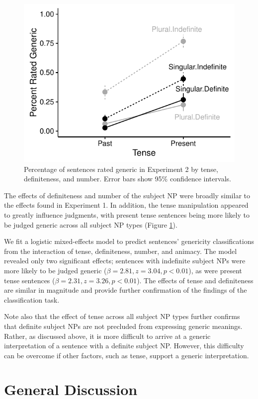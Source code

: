 \documentclass[10pt,letterpaper]{article}
\begin{document}
\begin{figure}[t]
\centering
\includegraphics[width=.8\linewidth]{figures/tense.pdf}
\caption{\label{fig:tense} Percentage of sentences rated generic in Experiment 2 by tense, definiteness, and number. Error bars show 95\% confidence intervals.}
\end{figure}

The effects of definiteness and number of the subject NP were broadly similar to the effects found in Experiment 1. In addition, the tense manipulation appeared to greatly influence judgments, with present tense sentences being more likely to be judged generic across all subject NP types (Figure \ref{fig:tense}).

We fit a logistic mixed-effects model to predict sentences' genericity classifications from the interaction of tense, definiteness, number, and animacy. The model revealed only two significant effects; sentences with indefinite subject NPs were more likely to be judged generic (\(\beta = 2.81, z = 3.04, p < 0.01\)), as were present tense sentences (\(\beta = 2.31, z = 3.26, p < 0.01\)). The effects of tense and definiteness are similar in magnitude and provide further confirmation of the findings of the classification task.

Note also that the effect of tense across all subject NP types further confirms that definite subject NPs are not precluded from expressing generic meanings. Rather, as discussed above, it is more difficult to arrive at a generic interpretation of a sentence with a definite subject NP. However, this difficulty can be overcome if other factors, such as tense, support a generic interpretation.

\section{General Discussion}
\end{document}
